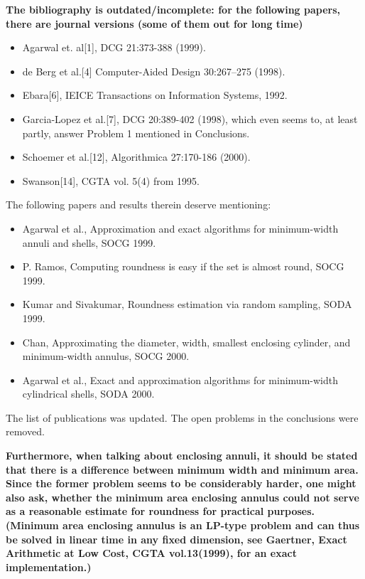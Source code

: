 \documentclass[lotsofwhite]{patmorin}
\newenvironment{comment}{\noindent\bf}{}
\newenvironment{response}{\noindent}{}
\begin{document}
\begin{comment}
The bibliography is outdated/incomplete: for the following papers,
there are journal versions (some of them out for long time)

\begin{itemize}
\item Agarwal et. al[1], DCG 21:373-388 (1999). 
\item de Berg et al.[4] Computer-Aided Design 30:267--275 (1998).
\item Ebara[6], IEICE Transactions on Information Systems, 1992.
\item Garcia-Lopez et al.[7], DCG 20:389-402 (1998), which even seems to, 
  at least partly, answer Problem 1 mentioned in Conclusions. 
\item Schoemer et al.[12], Algorithmica 27:170-186 (2000).
\item Swanson[14], CGTA vol. 5(4) from 1995. 
\end{itemize}

The following papers and results therein deserve mentioning:

\begin{itemize}
\item Agarwal et al., Approximation and exact algorithms for minimum-width
annuli and shells, SOCG 1999.
\item P. Ramos, Computing roundness is easy if the set is almost round,
SOCG 1999.
\item Kumar and Sivakumar, Roundness estimation via random sampling, SODA
1999.
\item Chan, Approximating the diameter, width, smallest enclosing
cylinder, and minimum-width annulus, SOCG 2000.
\item Agarwal et al., Exact and approximation algorithms for minimum-width
cylindrical shells, SODA 2000.
\end{itemize}

\end{comment}

\begin{response}
The list of publications was updated.  The open problems in the
conclusions were removed.
\end{response}


\begin{comment}
Furthermore, when talking about enclosing annuli, it should be stated
that there is a difference between minimum width and minimum area.
Since the former problem seems to be considerably harder, one might
also ask, whether the minimum area enclosing annulus could not serve
as a reasonable estimate for roundness for practical
purposes. (Minimum area enclosing annulus is an LP-type problem and
can thus be solved in linear time in any fixed dimension, see
Gaertner, Exact Arithmetic at Low Cost, CGTA vol.13(1999), for an
exact implementation.)
\end{comment}
\end{document}
